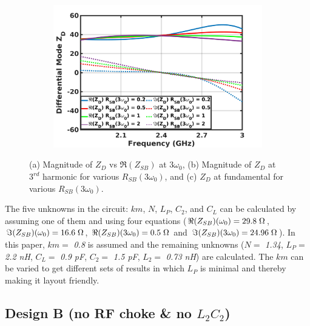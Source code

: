 \documentclass[conference]{IEEEtran}
\begin{document}
\begin{figure}[!t]
\begin{subfigure}{0.4\textwidth}
\includegraphics[width=1\textwidth]{Images/Design/Design_A_Rn_var_1H.jpg}
\caption{}
\label{fig:Design_A_Rn_var_1H}
\end{subfigure}
\caption{(a) Magnitude of $Z_{D}$ vs $\Re(Z_{SB})$ at $3\omega_0$, (b) Magnitude of $Z_D$ at $3^{rd}$ harmonic for various $R_{SB}(3\omega_0)$, and (c) $Z_D$ at fundamental for various $R_{SB}(3\omega_0)$.}
\label{fig:Design_A_Rn_var}
\vspace{-0.2in}
\end{figure}

The five unknowns in the circuit: $km$, $N$, $L_P$, $C_2$, and $C_L$ can be calculated by assuming one of them and using four equations ($\Re(Z_{SB})(\omega_0) =  29.8\hspace{1mm} \Omega$, $\Im(Z_{SB})(\omega_0) = 16.6\hspace{1mm}\Omega$, $\Re(Z_{SB})(3\omega_0) = 0.5\hspace{1mm}\Omega$ and  $\Im(Z_{SB})(3\omega_0) = 24.96\hspace{1mm}\Omega$). In this paper, $km =$ \textit{0.8} is assumed and the remaining unknowns ($N =$ \textit{1.34}, $L_P =$ \textit{2.2 nH}, $C_L =$ \textit{0.9 pF}, $C_2 =$ \textit{1.5 pF}, $L_2 =$ \textit{0.73 nH}) are calculated. The $km$ can be varied to get different sets of results in which $L_P$ is minimal and thereby making it layout friendly.


\subsection{Design B (no RF choke \& no $L_2C_2$)}
\end{document}
